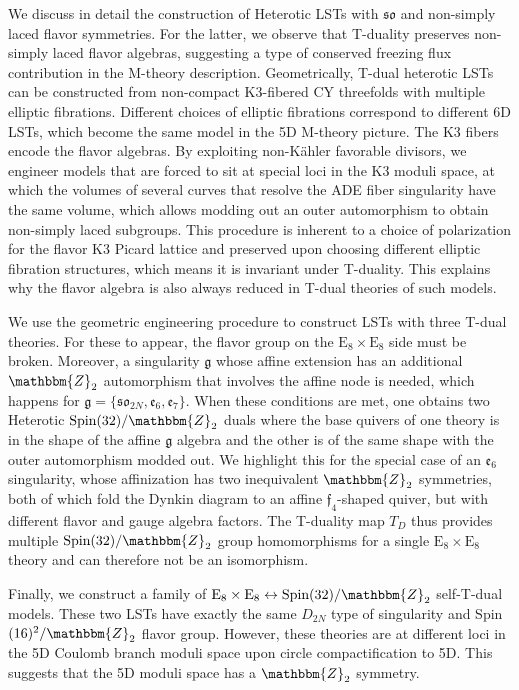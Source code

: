 \documentclass[11pt]{article}
\numberwithin{equation}{section}
\newcommand{\fso}{\mathfrak{so}}
\newcommand{\fg}{\mathfrak{g}}
\newcommand{\ff}{\mathfrak{f}}
\newcommand{\fe}{\mathfrak{e}}
\begin{document}
We discuss in detail the construction of Heterotic LSTs with $\fso$ and non-simply laced flavor symmetries. For the latter, we observe that T-duality preserves non-simply laced flavor algebras, suggesting a type of conserved freezing flux contribution in the M-theory description. Geometrically, T-dual heterotic LSTs can be constructed from non-compact K3-fibered CY threefolds with multiple elliptic fibrations. Different choices of elliptic fibrations correspond to different 6D LSTs, which become the same model in the 5D M-theory picture. The K3 fibers encode the flavor algebras. By exploiting non-K\"ahler favorable divisors, we engineer models that are forced to sit at special loci in the K3 moduli space, at which the volumes of several curves that resolve the ADE fiber singularity have the same volume, which allows modding out an outer automorphism to obtain non-simply laced subgroups. This procedure is inherent to a choice of polarization for the flavor K3 Picard lattice and preserved upon choosing different elliptic fibration structures, which means it is invariant under T-duality. This explains why the flavor algebra is also always reduced in T-dual theories of such models.

We use the geometric engineering procedure to construct LSTs with three T-dual theories. For these to appear, the flavor group on the $\text{E}_8\times \text{E}_8$ side must be broken. Moreover, a singularity $\fg$ whose affine extension has an additional $\mathbbm{Z}_2$ automorphism that involves the affine node is needed, which happens for $\fg=\{\fso_{2N}, \fe_6,\fe_7\}$. When these conditions are met, one obtains two Heterotic $\text{Spin}(32)/\mathbbm{Z}_2$ duals where the base quivers of one theory is in the shape of the affine $\fg$ algebra and the other is of the same shape with the outer automorphism modded out. We highlight this for the special case of an $\fe_6$ singularity, whose affinization has two inequivalent $\mathbbm{Z}_2$ symmetries, both of which fold the Dynkin diagram to an affine $\ff_4$-shaped quiver, but with different flavor and gauge algebra factors. The T-duality map $T_D$ thus provides multiple $\text{Spin}(32)/\mathbbm{Z}_2$ group homomorphisms for a single $\text{E}_8\times \text{E}_8$ theory and can therefore not be an isomorphism. 

Finally, we construct a family of $\text{E}_8\times \text{E}_8 \leftrightarrow \text{Spin}(32)/\mathbbm{Z}_2$ self-T-dual models. These two LSTs have exactly the same $D_{2N}$ type of singularity and Spin$(16)^2/\mathbbm{Z}_2$ flavor group. However, these theories are at different loci in the 5D Coulomb branch moduli space upon circle compactification to 5D. This suggests that the 5D moduli space has a $\mathbbm{Z}_2$ symmetry.
\end{document}
